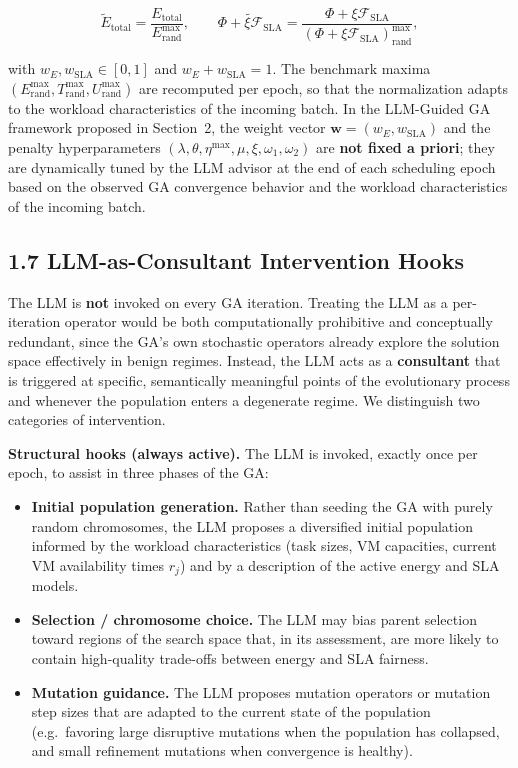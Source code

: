 \documentclass[11pt,a4paper]{article}
\begin{document}
$$
\tilde{E}_{\text{total}} = \frac{E_{\text{total}}}{E^{\max}_{\text{rand}}}, \qquad
\widetilde{\Phi + \xi \mathcal{F}_{\text{SLA}}} = \frac{\Phi + \xi \mathcal{F}_{\text{SLA}}}{(\Phi + \xi \mathcal{F}_{\text{SLA}})^{\max}_{\text{rand}}},
$$

with $w_E, w_{\text{SLA}} \in [0,1]$ and $w_E + w_{\text{SLA}} = 1$. The benchmark maxima $(E^{\max}_{\text{rand}}, T^{\max}_{\text{rand}}, U^{\max}_{\text{rand}})$ are recomputed per epoch, so that the normalization adapts to the workload characteristics of the incoming batch. In the LLM-Guided GA framework proposed in Section~2, the weight vector $\mathbf{w} = (w_E, w_{\text{SLA}})$ and the penalty hyperparameters $(\lambda, \theta, \eta^{\max}, \mu, \xi, \omega_1, \omega_2)$ are \textbf{not fixed a priori}; they are dynamically tuned by the LLM advisor at the end of each scheduling epoch based on the observed GA convergence behavior and the workload characteristics of the incoming batch.

\subsection*{1.7 LLM-as-Consultant Intervention Hooks}

The LLM is \textbf{not} invoked on every GA iteration. Treating the LLM as a per-iteration operator would be both computationally prohibitive and conceptually redundant, since the GA's own stochastic operators already explore the solution space effectively in benign regimes. Instead, the LLM acts as a \textbf{consultant} that is triggered at specific, semantically meaningful points of the evolutionary process and whenever the population enters a degenerate regime. We distinguish two categories of intervention.

\textbf{Structural hooks (always active).} The LLM is invoked, exactly once per epoch, to assist in three phases of the GA:
\begin{itemize}[leftmargin=2em,itemsep=2pt]
  \item \textbf{Initial population generation.} Rather than seeding the GA with purely random chromosomes, the LLM proposes a diversified initial population informed by the workload characteristics (task sizes, VM capacities, current VM availability times $r_j$) and by a description of the active energy and SLA models.
  \item \textbf{Selection / chromosome choice.} The LLM may bias parent selection toward regions of the search space that, in its assessment, are more likely to contain high-quality trade-offs between energy and SLA fairness.
  \item \textbf{Mutation guidance.} The LLM proposes mutation operators or mutation step sizes that are adapted to the current state of the population (e.g.\ favoring large disruptive mutations when the population has collapsed, and small refinement mutations when convergence is healthy).
\end{itemize}
\end{document}
